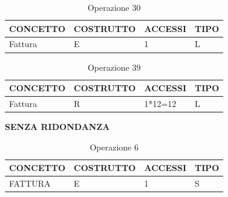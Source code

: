 \begin{table}[H]
\centering
\caption{Operazione 30}
\begin{tabular}{llll}
\\ \hline
\multicolumn{1}{|l|}{\textbf{CONCETTO}} & \multicolumn{1}{l|}{\textbf{COSTRUTTO}} & \multicolumn{1}{l|}{\textbf{ACCESSI}} & \multicolumn{1}{l|}{\textbf{TIPO}} \\ \hline
\multicolumn{1}{|l|}{Fattura}
& \multicolumn{1}{l|}{E}                  & \multicolumn{1}{l|}{1}                & \multicolumn{1}{l|}{L}             \\ \hline
\end{tabular}
\end{table}

\begin{table}[H]
\centering
\caption{Operazione 39}
\begin{tabular}{llll}
\\ \hline
\multicolumn{1}{|l|}{\textbf{CONCETTO}} & \multicolumn{1}{l|}{\textbf{COSTRUTTO}} & \multicolumn{1}{l|}{\textbf{ACCESSI}} & \multicolumn{1}{l|}{\textbf{TIPO}} \\ \hline
\multicolumn{1}{|l|}{Fattura}
& \multicolumn{1}{l|}{R}                  & \multicolumn{1}{l|}{1*12=12}                & \multicolumn{1}{l|}{L}             \\ \hline
\end{tabular}
\end{table}


\newline\newline\centerline{\textbf{SENZA RIDONDANZA}}
\begin{table}[H]
\centering
\caption{Operazione 6}
\begin{tabular}{llll}
\\ \hline
\multicolumn{1}{|l|}{\textbf{CONCETTO}} & \multicolumn{1}{l|}{\textbf{COSTRUTTO}} & \multicolumn{1}{l|}{\textbf{ACCESSI}} & \multicolumn{1}{l|}{\textbf{TIPO}} \\ \hline
\multicolumn{1}{|l|}{FATTURA}
& \multicolumn{1}{l|}{E}                  & \multicolumn{1}{l|}{1}                & \multicolumn{1}{l|}{S}             \\ \hline
\end{tabular}
\end{table}


